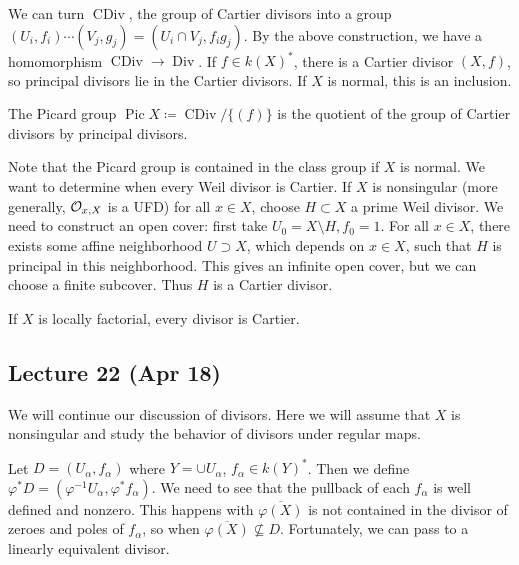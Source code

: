 \documentclass[twoside, 10pt]{article}
\begin{document}
        We can turn $\operatorname{CDiv}$, the group of Cartier divisors into a group $(U_i,f_i) \cdots (V_j,g_j) = (U_i \cap V_j, f_ig_j)$. By the above construction, we have a homomorphism $\operatorname{CDiv} \to \operatorname{Div}$. If $f \in k(X)^*$, there is a Cartier divisor $(X,f)$, so principal divisors lie in the Cartier divisors. If $X$ is normal, this is an inclusion.

        \begin{defn}
            The Picard group $\operatorname{Pic} X \coloneqq \operatorname{CDiv}/\{(f)\}$ is the quotient of the group of Cartier divisors by principal divisors.
        \end{defn}

        Note that the Picard group is contained in the class group if $X$ is normal. We want to determine when every Weil divisor is Cartier. If $X$ is nonsingular (more generally, $\mathcal{O}_{x,X}$ is a UFD) for all $x \in X$, choose $H \subset X$ a prime Weil divisor. We need to construct an open cover: first take $U_0 = X \setminus H, f_0 = 1$. For all $x \in X$, there exists some affine neighborhood $U \supset X$, which depends on $x \in X$, such that $H$ is principal in this neighborhood. This gives an infinite open cover, but we can choose a finite subcover. Thus $H$ is a Cartier divisor.

        \begin{cor}
            If $X$ is locally factorial, every divisor is Cartier.
        \end{cor}

        \subsection{Lecture 22 (Apr 18)}
        We will continue our discussion of divisors. Here we will assume that $X$ is nonsingular and study the behavior of divisors under regular maps.

        Let $D = (U_{\alpha}, f_{\alpha})$ where $Y= \cup U_{\alpha}$, $f_{\alpha}\in k(Y)^*$. Then we define $\varphi^*D = (\varphi^{-1}U_{\alpha}, \varphi^* f_{\alpha})$. We need to see that the pullback of each $f_{\alpha}$ is well defined and nonzero. This happens with $\overline{\varphi(X)}$ is not contained in the divisor of zeroes and poles of $f_{\alpha}$, so when $\overline{\varphi(X)} \not\subseteq D$. Fortunately, we can pass to a linearly equivalent divisor.
\end{document}
